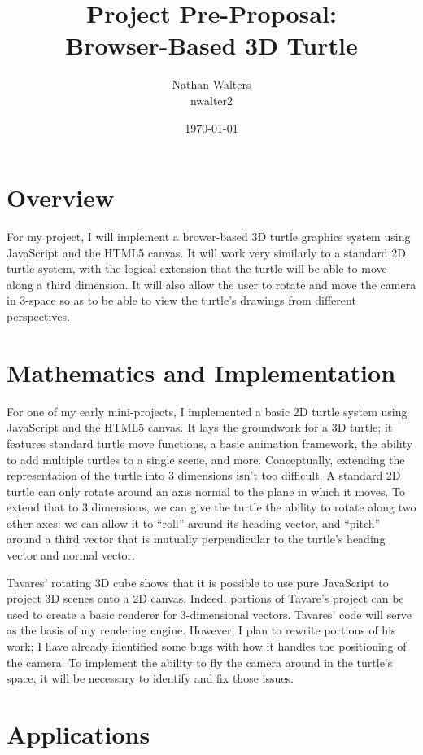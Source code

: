 \documentclass[12pt]{article}
\title{\vspace{-8ex}Project Pre-Proposal:\\Browser-Based 3D Turtle}
\author{Nathan Walters\\nwalter2}
\date{\today}
\begin{document}
\maketitle

\section{Overview}

For my project, I will implement a brower-based 3D turtle graphics system using JavaScript and the HTML5 canvas. It will work very similarly to a standard 2D turtle system, with the logical extension that the turtle will be able to move along a third dimension. It will also allow the user to rotate and move the camera in 3-space so as to be able to view the turtle's drawings from different perspectives.

\section{Mathematics and Implementation}

For one of my early mini-projects, I implemented a basic 2D turtle system using JavaScript and the HTML5 canvas. It lays the groundwork for a 3D turtle; it features standard turtle move functions, a basic animation framework, the ability to add multiple turtles to a single scene, and more. Conceptually, extending the representation of the turtle into 3 dimensions isn't too difficult. A standard 2D turtle can only rotate around an axis normal to the plane in which it moves. To extend that to 3 dimensions, we can give the turtle the ability to rotate along two other axes: we can allow it to ``roll'' around its heading vector, and ``pitch'' around a third vector that is mutually perpendicular to the turtle's heading vector and normal vector.

Tavares' rotating 3D cube shows that it is possible to use pure JavaScript to project 3D scenes onto a 2D canvas. Indeed, portions of Tavare's project can be used to create a basic renderer for 3-dimensional vectors. Tavares' code will serve as the basis of my rendering engine. However, I plan to rewrite portions of his work; I have already identified some bugs with how it handles the positioning of the camera. To implement the ability to fly the camera around in the turtle's space, it will be necessary to identify and fix those issues.

\section{Applications}
\end{document}

